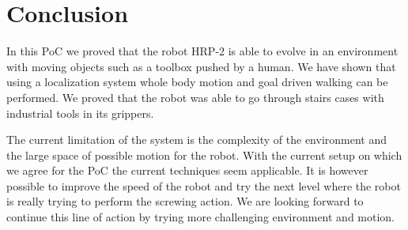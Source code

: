 \section{Conclusion}
In this PoC we proved that the robot HRP-2 is able to evolve in an environment with moving objects such as a toolbox pushed by a human. 
We have shown that using a localization system whole body motion and goal driven walking can be performed.
We proved that the robot was able to go through stairs cases with industrial tools in its grippers.

The current limitation of the system is the complexity 
of the environment and the large space of possible motion for the robot.
With the current setup on which we agree for the PoC the current techniques seem applicable.
It is however possible to improve the speed of the robot and try the next level where the robot is really trying to perform the screwing action.
We are looking forward to continue this line of action by trying more challenging environment and motion.